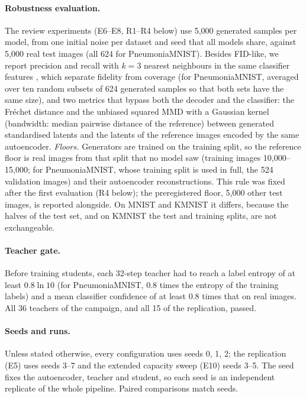 \documentclass[11pt]{article}
\newcommand{\fidlike}{FID-like}
\begin{document}
\paragraph{Robustness evaluation.} The review experiments (E6--E8, R1--R4 below)
use 5{,}000 generated samples per model, from one initial noise per dataset and
seed that all models share, against 5{,}000 real test images (all 624 for
PneumoniaMNIST). Besides \fidlike{}, we report precision and recall with $k=3$
nearest neighbours in the same classifier features \citep{kynkaanniemi2019improved},
which separate fidelity from coverage (for PneumoniaMNIST, averaged over ten
random subsets of 624 generated samples so that both sets have the same size),
and two metrics that bypass both the decoder and the classifier: the Fréchet
distance and the unbiased squared MMD with a Gaussian kernel (bandwidth: median
pairwise distance of the reference) \citep{gretton2012kernel} between generated
standardised latents and the latents of the reference images encoded by the same
autoencoder. \emph{Floors.} Generators are trained on the training split, so the
reference floor is real images from that split that no model saw (training images
10{,}000--15{,}000; for PneumoniaMNIST, whose training split is used in full, the
524 validation images) and their autoencoder reconstructions. This rule was fixed
after the first evaluation (R4 below); the preregistered floor, 5{,}000 other test
images, is reported alongside. On MNIST and KMNIST it differs, because the halves
of the test set, and on KMNIST the test and training splits, are not exchangeable.

\paragraph{Teacher gate.} Before training students, each 32-step teacher had
to reach a label entropy of at least $0.8\ln 10$ (for PneumoniaMNIST, $0.8$
times the entropy of the training labels) and a mean classifier confidence of at
least 0.8 times that on real images. All 36 teachers of the campaign, and all 15
of the replication, passed.

\paragraph{Seeds and runs.} Unless stated otherwise, every configuration uses
seeds 0, 1, 2; the replication (E5) uses seeds 3--7 and the extended capacity sweep
(E10) seeds 3--5. The seed fixes the autoencoder, teacher and student, so each
seed is an independent replicate of the whole pipeline. Paired comparisons match
seeds.
\end{document}

